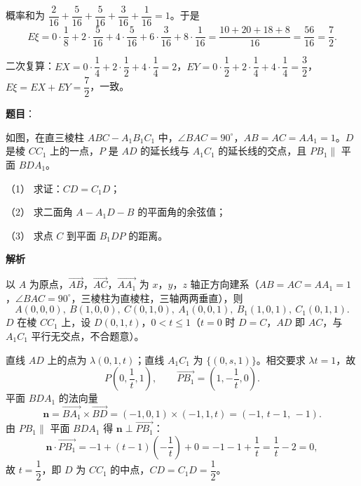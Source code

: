 \begin{answer}
概率和为 $\dfrac2{16}+\dfrac5{16}+\dfrac5{16}+\dfrac3{16}+\dfrac1{16}=1$。于是
\nopagebreak[4]
\[E\xi=0\cdot\frac18+2\cdot\frac5{16}+4\cdot\frac5{16}+6\cdot\frac3{16}+8\cdot\frac1{16}=\frac{10+20+18+8}{16}=\frac{56}{16}=\frac72.\]

二次复算：$EX=0\cdot\dfrac14+2\cdot\dfrac12+4\cdot\dfrac14=2$，$EY=0\cdot\dfrac12+2\cdot\dfrac14+4\cdot\dfrac14=\dfrac32$，$E\xi=EX+EY=\dfrac72$，一致。



\end{answer}
\begin{answer}

\textbf{题目}：

如图，在直三棱柱 $ABC-A_1B_1C_1$ 中，$\angle BAC=90^\circ$，$AB=AC=AA_1=1$。$D$ 是棱 $CC_1$ 上的一点，$P$ 是 $AD$ 的延长线与 $A_1C_1$ 的延长线的交点，且 $PB_1\parallel$ 平面 $BDA_1$。

（1） 求证：$CD=C_1D$；

（2） 求二面角 $A-A_1D-B$ 的平面角的余弦值；

（3） 求点 $C$ 到平面 $B_1DP$ 的距离。
\nopagebreak[4]
\begin{center}\end{center}
\nopagebreak[4]
\textbf{解析}

以 $A$ 为原点，$\overrightarrow{AB}$，$\overrightarrow{AC}$，$\overrightarrow{AA_1}$ 为 $x$，$y$，$z$ 轴正方向建系（$AB=AC=AA_1=1$，$\angle BAC=90^\circ$，三棱柱为直棱柱，三轴两两垂直），则
\nopagebreak[4]
\[A(0,0,0),\ B(1,0,0),\ C(0,1,0),\ A_1(0,0,1),\ B_1(1,0,1),\ C_1(0,1,1).\]
$D$ 在棱 $CC_1$ 上，设 $D(0,1,t)$，$0<t\leqslant1$（$t=0$ 时 $D=C$，$AD$ 即 $AC$，与 $A_1C_1$ 平行无交点，不合题意）。

直线 $AD$ 上的点为 $\lambda(0,1,t)$；直线 $A_1C_1$ 为 $\{(0,s,1)\}$。相交要求 $\lambda t=1$，故
\nopagebreak[4]
\[P\left(0,\frac1t,1\right),\qquad \overrightarrow{PB_1}=\left(1,-\frac1t,0\right).\]
平面 $BDA_1$ 的法向量
\nopagebreak[4]
\[\boldsymbol n=\overrightarrow{BA_1}\times\overrightarrow{BD}=(-1,0,1)\times(-1,1,t)=(-1,\,t-1,\,-1).\]
由 $PB_1\parallel$ 平面 $BDA_1$ 得 $\boldsymbol n\perp\overrightarrow{PB_1}$：
\nopagebreak[4]
\[\boldsymbol n\cdot\overrightarrow{PB_1}=-1+(t-1)\left(-\frac1t\right)+0=-1-1+\frac1t=\frac1t-2=0,\]
故 $t=\dfrac12$，即 $D$ 为 $CC_1$ 的中点，$CD=C_1D=\dfrac12$。


\end{answer}
